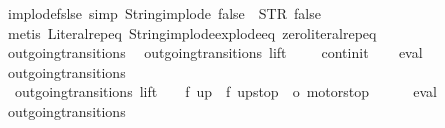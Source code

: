 \begin{isabellebody}
\ implode{\isacharunderscore}fslse\ {\isacharbrackleft}simp{\isacharbrackright}{\isacharcolon}\ {\isachardoublequoteopen}String{\isachardot}implode\ {\isacharprime}{\isacharprime}false{\isacharprime}{\isacharprime}\ {\isacharequal}\ STR\ {\isacharprime}{\isacharprime}false{\isacharprime}{\isacharprime}{\isachardoublequoteclose}\isanewline
%
\isadelimproof
\ \ %
\endisadelimproof
%
\isatagproof
{}\isamarkupfalse%
\ {\isacharparenleft}metis\ Literal{\isachardot}rep{\isacharunderscore}eq\ String{\isachardot}implode{\isacharunderscore}explode{\isacharunderscore}eq\ zero{\isacharunderscore}literal{\isachardot}rep{\isacharunderscore}eq{\isacharparenright}%
\endisatagproof
{\isafoldproof}%
%
\isadelimproof
\isanewline
%
\endisadelimproof
\isanewline
{}\isamarkupfalse%
\ outgoing{\isacharunderscore}transitions{\isacharunderscore}{}{\isacharcolon}\isanewline
\ \ {\isachardoublequoteopen}outgoing{\isacharunderscore}transitions\ lift\ {}\ {\isacharequal}\ {\isacharbraceleft}{\isacharbar}{\isacharparenleft}{\isacharparenleft}{}{\isacharcomma}\ {}{\isacharparenright}{\isacharcomma}\ continit{\isacharparenright}{\isacharbar}{\isacharbraceright}{\isachardoublequoteclose}\isanewline
%
\isadelimproof
\ \ %
\endisadelimproof
%
\isatagproof
{}\isamarkupfalse%
\ eval%
\endisatagproof
{\isafoldproof}%
%
\isadelimproof
\isanewline
%
\endisadelimproof
\isanewline
{}\isamarkupfalse%
\ outgoing{\isacharunderscore}transitions{\isacharunderscore}{}{\isacharcolon}\isanewline
\ \ {\isachardoublequoteopen}outgoing{\isacharunderscore}transitions\ lift\ {}\ {\isacharequal}\ {\isacharbraceleft}{\isacharbar}{\isacharparenleft}{\isacharparenleft}{}{\isacharcomma}\ f{}{\isacharparenright}{\isacharcomma}\ up{}{}{\isacharparenright}{\isacharcomma}\ {\isacharparenleft}{\isacharparenleft}{}{\isacharcomma}\ f{}{\isacharparenright}{\isacharcomma}\ up{}{}stop{\isacharparenright}{\isacharcomma}\ {\isacharparenleft}{\isacharparenleft}{}{\isacharcomma}\ o{}{\isacharparenright}{\isacharcomma}\ motorstop\ {}{\isacharparenright}\ {\isacharbar}{\isacharbraceright}{\isachardoublequoteclose}\isanewline
%
\isadelimproof
\ \ %
\endisadelimproof
%
\isatagproof
{}\isamarkupfalse%
\ eval%
\endisatagproof
{\isafoldproof}%
%
\isadelimproof
\isanewline
%
\endisadelimproof
\isanewline
{}\isamarkupfalse%
\ outgoing{\isacharunderscore}transitions{\isacharunderscore}{}{\isacharcolon}\isanewline

\end{isabellebody}
